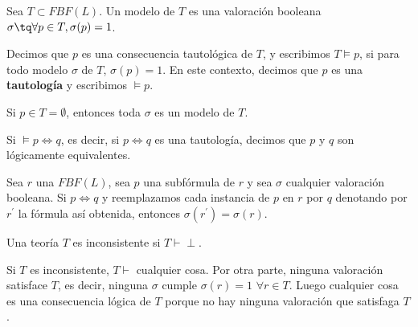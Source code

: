 \begin{defn}[Modelo]
	Sea $T\subset FBF(L)$. Un modelo de $T$ es una valoración booleana $\sigma \tq \forall p\in T, \sigma (p) = 1$.
\end{defn}

\begin{defn}
	Decimos que $p$ es una consecuencia tautológica de $T$, y escribimos $T\vDash p$, si para todo modelo $\sigma$ de $T$, $\sigma(p) = 1$. En este contexto, decimos que $p$ es una \textbf{tautología} y escribimos  $\vDash p$.
\end{defn}

\begin{obs}
	Si $p\in T = \emptyset$, entonces toda $\sigma$ es un modelo de $T$.
\end{obs}

\newpage

\begin{defn}
	Si $\vDash p \iff q$, es decir, si $p\iff q$ es una tautología, decimos que $p$ y $q$ son lógicamente equivalentes.
\end{defn}

\begin{obs}
	Sea $r$ una $FBF(L)$, sea $p$ una subfórmula de $r$ y sea $\sigma$ cualquier valoración booleana. Si $p\iff q$ y reemplazamos cada instancia de $p$ en $r$ por $q$ denotando por $r^\prime$ la fórmula así obtenida, entonces $\sigma(r^\prime) = \sigma(r)$.
\end{obs}

\begin{defn}
	Una teoría $T$ es inconsistente si $T\vdash \perp$.
\end{defn}

\begin{obs}
	Si $T$ es inconsistente, $T\vdash$ cualquier cosa.
	Por otra parte, ninguna valoración satisface $T$, es decir, ninguna $\sigma$ cumple $\sigma(r) = 1$ $\forall r\in T$. Luego cualquier cosa es una consecuencia lógica de $T$ porque no hay ninguna valoración que satisfaga $T$.
\end{obs}


